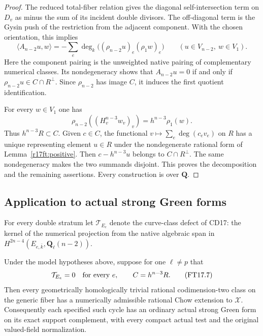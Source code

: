 \begin{proof}
The reduced total-fiber relation gives the diagonal
self-intersection term on $D_v$ as minus the sum of its
incident double divisors.  The off-diagonal term is the
Gysin push of the restriction from the adjacent component.
With the chosen orientation, this implies
\[
 \langle A_{n-2}u,w\rangle
       =-\sum_e\deg_k\bigl((\rho_{n-2}u)_e(\rho_1w)_e\bigr)
               \qquad(u\in V_{n-2},\ w\in V_1).
 \tag{FT17.6}\label{r17ft:incidence}
\]
Here the component pairing is the unweighted native pairing
of complementary numerical classes.  Its nondegeneracy
shows that $A_{n-2}u=0$ if and only if
$\rho_{n-2}u\in C\cap R^\perp$.  Since $\rho_{n-2}$ has
image $C$, it induces the first quotient identification.

For every $w\in V_1$ one has
\[
          \rho_{n-2}((H_v^{n-3}w_v)_v)
                    =h^{n-3}\rho_1(w).
\]
Thus $h^{n-3}R\subset C$.  Given $c\in C$, the functional
$v\mapsto\sum_e\deg(c_ev_e)$ on $R$ has a unique representing
element $u\in R$ under the nondegenerate rational form of
Lemma~\ref{r17ft:positive}.  Then $c-h^{n-3}u$ belongs to
$C\cap R^\perp$.  The same nondegeneracy makes the two
summands disjoint.  This proves the decomposition and the
remaining assertions.  Every construction is over $\mathbf Q$.
\end{proof}

\subsection{Application to actual strong Green forms}

For every double stratum let $\mathcal T_{E_e}$ denote the
curve-class defect of CD17: the kernel of the numerical
projection from the native algebraic span in
$H^{2n-4}(E_{e,\bar k},\mathbf Q_\ell(n-2))$.

\begin{theorem}
\label{r17ft:theorem}
Under the model hypotheses above, suppose for one $\ell\ne p$
that
\[
           \mathcal T_{E_e}=0\quad\hbox{for every }e,
                    \qquad C=h^{n-3}R.
 \tag{FT17.7}\label{r17ft:conditions}
\]
Then every geometrically homologically trivial rational
codimension-two class on the generic fiber has a numerically
admissible rational Chow extension to $\mathcal X$.
Consequently each specified such cycle has an ordinary actual
strong Green form on its exact support complement, with every
compact actual test and the original valued-field normalization.
\end{theorem}


